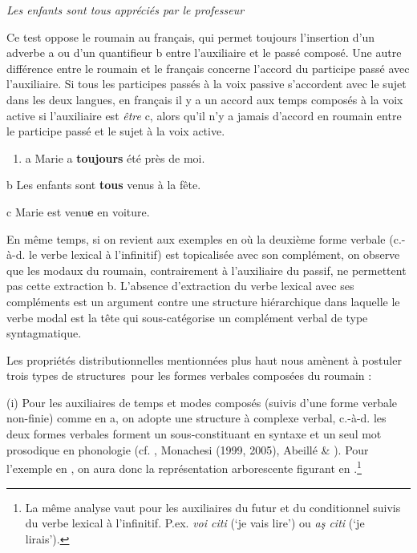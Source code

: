     \textit{Les enfants sont tous appréciés par le professeur}

Ce test oppose le roumain au français, qui permet toujours l'insertion d'un adverbe a ou d'un quantifieur b entre l'auxiliaire et le passé composé. Une autre différence entre le roumain et le français concerne l'accord du participe passé avec l'auxiliaire. Si tous les participes passés à la voix passive s'accordent avec le sujet dans les deux langues, en français il y a un accord aux temps composés à la voix active si l'auxiliaire est \textit{être} c, alors qu'il n'y a jamais d'accord en roumain entre le participe passé et le sujet à la voix active. 


\begin{enumerate}
\item \label{bkm:Ref276465206}a  Marie a \textbf{toujours} été près de moi.  


\end{enumerate}
  b  Les enfants sont \textbf{tous} venus à la fête.

  c  Marie est venu\textbf{e} en voiture.

En même temps, si on revient aux exemples en  où la deuxième forme verbale (c.-à-d. le verbe lexical à l'infinitif) est topicalisée avec son complément, on observe que les modaux du roumain, contrairement à l'auxiliaire du passif, ne permettent pas cette extraction b. L'absence d'extraction du verbe lexical avec ses compléments est un argument contre une structure hiérarchique dans laquelle le verbe modal est la tête qui sous-catégorise un complément verbal de type syntagmatique.  

Les propriétés distributionnelles mentionnées plus haut nous amènent à postuler trois types de structures~pour les formes verbales composées du roumain :

(i) Pour les auxiliaires de temps et modes composés (suivis d'une forme verbale non-finie) comme en a, on adopte une structure à complexe verbal, c.-à-d. les deux formes verbales forment un sous-constituant en syntaxe et un seul mot prosodique en phonologie (cf. \citet{Barbu1999}, Monachesi (1999, 2005), Abeillé \& \citet{Godard2003}). Pour l'exemple en , on aura donc la représentation arborescente figurant en .\footnote{La même analyse vaut pour les auxiliaires du futur et du conditionnel suivis du verbe lexical à l'infinitif. P.ex. \textit{voi citi} (`je vais lire') ou \textit{aş citi} (`je lirais').}


